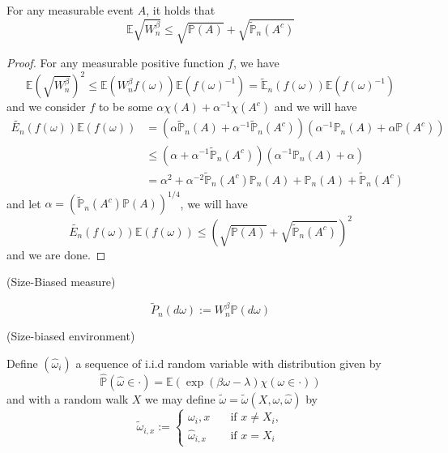 \begin{lemma}
    For any measurable event $A$, it holds that
    \[
    \mathbb{E}\sqrt{W_n^{\beta}} \leq \sqrt{\mathbb{P}(A)} + \sqrt{\tilde{\mathbb{P}}_n(A^c)} 
    \]
\end{lemma}
\begin{proof}
    For any measurable positive function $f$, we have
    \[
    \mathbb{E}(\sqrt{W_n^{\beta}})^2 \leq \mathbb{E}(W_n^{\beta}f(\omega))\mathbb{E}(f(\omega)^{-1}) = \widetilde{\mathbb{E}}_n(f(\omega))\mathbb{E}(f(\omega)^{-1})
    \]
    and we consider $f$ to be some $\alpha \chi(A) + \alpha^{-1}\chi(A^c)$ and we will have
    \[
    \begin{aligned}
        \widetilde{E_n}(f(\omega))\mathbb{E}(f(\omega)) &= (\alpha \widetilde{\mathbb{P}}_n(A) + \alpha^{-1}\widetilde{\mathbb{P}}_n(A^c))(\alpha^{-1}\mathbb{P}_n(A) + \alpha\mathbb{P}(A^c)) \\
        &\leq (\alpha + \alpha^{-1}\widetilde{\mathbb{P}}_n(A^c))(\alpha^{-1}\mathbb{P}_n(A) + \alpha) \\
        &= \alpha^2 +\alpha^{-2}\widetilde{\mathbb{P}}_n(A^c)\mathbb{P}_n(A) + \mathbb{P}_n(A) + \widetilde{\mathbb{P}}_n(A^c)
    \end{aligned}
    \]
    and let $\alpha = (\widetilde{\mathbb{P}}_n(A^c)\mathbb{P}(A))^{1/4}$, we will have
    \[
    \widetilde{E_n}(f(\omega))\mathbb{E}(f(\omega)) \leq \left(\sqrt{\mathbb{P}(A)}+\sqrt{\widetilde{\mathbb{P}}_n(A^c)}\right)^2
    \]
    and we are done.
\end{proof}


\begin{definition}
    (Size-Biased measure)\par
    \[
    \tilde{P}_n(d\omega):= W_n^{\beta}\mathbb{P}(d\omega)
    \]
\end{definition}

\begin{definition}
    (Size-biased environment)\par
    Define $(\hat{\omega}_i)$ a sequence of i.i.d random variable with distribution given by
    \[
    \hat{\mathbb{P}}(\hat{\omega} \in \cdot) = \mathbb{E}(\exp(\beta\omega - \lambda)\chi(\omega \in \cdot))
    \]
    and with a random walk $X$ we may define $\tilde{\omega} = \tilde{\omega}(X,\omega,\hat{\omega})$ by
    \[
    \tilde{\omega}_{i,x} := \begin{cases}
        \omega_i,x\quad&\text{if }x\neq X_i,\\
        \hat{\omega}_{i,x}&\text{if }x=X_i
    \end{cases}
    \]
\end{definition}

